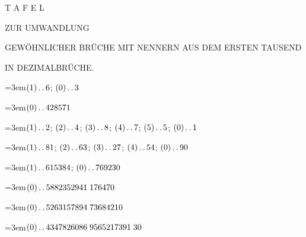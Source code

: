 \clearpage{}\thispagestyle{empty}
\renewcommand{\BookRunningTitle}{Umwandlung gewöhnlicher Brüche in Dezimalbrüche}
\begin{center}
\vspace*{1.0in}
{\LARGE T A F E L}\par\bigskip
{\large ZUR UMWANDLUNG}\par\bigskip
{\Large GEWÖHNLICHER BRÜCHE MIT NENNERN AUS DEM ERSTEN TAUSEND}\par\bigskip
{\large IN DEZIMALBRÜCHE.}
\end{center}

\clearpage{}%
\begingroup\raggedright{} 
\par\noindent\hangindent=3em\enspace $(1)\mathinner{.\,.}6$; $(0)\mathinner{.\,.}3$\par\smallskip

\par\noindent\hangindent=3em\enspace $(0)\mathinner{.\,.}428571$\par\smallskip

\par\noindent\hangindent=3em\enspace $(1)\mathinner{.\,.}2$; $(2)\mathinner{.\,.}4$; $(3)\mathinner{.\,.}8$; $(4)\mathinner{.\,.}7$; $(5)\mathinner{.\,.}5$; $(0)\mathinner{.\,.}1$\par\smallskip

\par\noindent\hangindent=3em\enspace $(1)\mathinner{.\,.}81$; $(2)\mathinner{.\,.}63$; $(3)\mathinner{.\,.}27$; $(4)\mathinner{.\,.}54$; $(0)\mathinner{.\,.}90$\par\smallskip

\par\noindent\hangindent=3em\enspace $(1)\mathinner{.\,.}615384$; $(0)\mathinner{.\,.}769230$\par\smallskip

\par\noindent\hangindent=3em\enspace $(0)\mathinner{.\,.}5882352941\;\allowbreak 176470$\par\smallskip

\par\noindent\hangindent=3em\enspace $(0)\mathinner{.\,.}5263157894\;\allowbreak 73684210$\par\smallskip

\par\noindent\hangindent=3em\enspace $(0)\mathinner{.\,.}4347826086\;\allowbreak 9565217391\;\allowbreak 30$\par\smallskip

